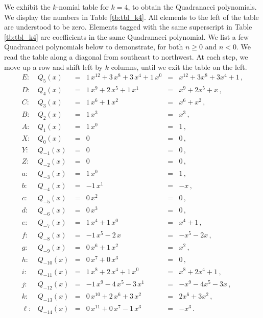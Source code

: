 \documentclass[review]{elsarticle}
\theoremstyle{plain}
\begin{document}
We exhibit the $k$-nomial table for $k=4$, to obtain the Quadranacci polynomials.
We display the numbers in Table \ref{tb:tbl_k4}.
All elements to the left of the table are understood to be zero.
Elements tagged with the same superscript in Table \ref{tb:tbl_k4} are coefficients in the same Quadranacci polynomial.
We list a few Quadranacci polynomials below to demonstrate, for both $n\ge0$ and $n<0$.
We read the table along a diagonal from southeast to northwest.
At each step, we move up a row and shift left by $k$ columns, until we exit the table on the left.
\begin{equation}
\label{eq:Quad_from_table}
\begin{array}{llllllllllll}
  E: & Q_{5}(x) &=& 1\,x^{12} +3\,x^8 +3\,x^4 +1\,x^0  &=& x^{12} +3x^8 +3x^4 +1 \,, \\
  D: & Q_{4}(x) &=& 1\,x^9 +2\,x^5 +1\,x^1  &=& x^9 +2x^5 +x \,, \\
  C: & Q_{3}(x) &=& 1\,x^6 +1\,x^2 &=& x^6 +x^2 \,, \\
  B: & Q_{2}(x) &=& 1\,x^3 &=& x^3 \,, \\
  A: & Q_{1}(x) &=& 1\,x^0 &=& 1 \,, \\
  X: & Q_{0}(x) &=& 0 &=& 0 \,, \\
  Y: & Q_{-1}(x) &=& 0 &=& 0 \,, \\
  Z: & Q_{-2}(x) &=& 0 &=& 0 \,, \\
  a: & Q_{-3}(x) &=& 1\,x^0 &=& 1 \,, \\
  b: & Q_{-4}(x) &=& -1\,x^1 &=& -x \,, \\
  c: & Q_{-5}(x) &=& 0\,x^2 &=& 0 \,, \\
  d: & Q_{-6}(x) &=& 0\,x^3 &=& 0 \,, \\
  e: & Q_{-7}(x) &=& 1\,x^4+1\,x^0 &=& x^4+1 \,, \\
  f: & Q_{-8}(x) &=& -1\,x^5-2\,x &=& -x^5-2x \,, \\
  g: & Q_{-9}(x) &=& 0\,x^6+1\,x^2 &=& x^2 \,, \\
  h: & Q_{-10}(x) &=& 0\,x^7+0\,x^3 &=& 0 \,, \\
  i: & Q_{-11}(x) &=& 1\,x^8+2\,x^4+1\,x^0 &=& x^8+2x^4+1 \,, \\
  j: & Q_{-12}(x) &=& -1\,x^9-4\,x^5-3\,x^1 &=& -x^9-4x^5-3x \,, \\
  k: & Q_{-13}(x) &=& 0\,x^{10}+2\,x^6+3\,x^2 &=& 2x^6+3x^2 \,, \\
  \ell: & Q_{-14}(x) &=& 0\,x^{11}+0\,x^7-1\,x^3 &=& -x^3 \,.
\end{array}
\end{equation}
\end{document}
